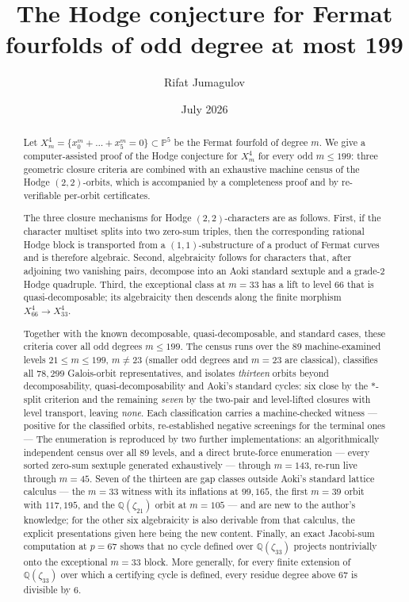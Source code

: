 \documentclass[11pt]{amsart}
\title[Hodge classes on odd-degree Fermat fourfolds]{The Hodge conjecture for Fermat fourfolds
of odd degree at most 199}
\author{Rifat Jumagulov}
\date{July 2026}
\theoremstyle{remark}
\newcommand{\Q}{\mathbb{Q}}
\newcommand{\PP}{\mathbb{P}}
\newcommand{\zt}{\zeta}
\begin{document}
\raggedbottom\vfuzz=3pt
\begin{abstract}
Let $X^4_m=\{x_0^m+\dots+x_5^m=0\}\subset\PP^5$ be the Fermat fourfold of degree $m$. We give a
computer-assisted proof of the Hodge conjecture for $X^4_m$ for every odd $m\le199$: three
geometric closure criteria are combined with an exhaustive machine census of the Hodge
$(2,2)$-orbits, which is accompanied by a completeness proof and by re-verifiable per-orbit
certificates.

The three closure mechanisms for Hodge $(2,2)$-characters are as follows. First, if the
character multiset splits into two zero-sum triples, then the corresponding rational Hodge
block is transported from a $(1,1)$-substructure of a product of Fermat curves and is therefore
algebraic. Second, algebraicity follows for characters that, after adjoining two vanishing
pairs, decompose into an Aoki standard sextuple and a grade-$2$ Hodge quadruple. Third, the
exceptional class at $m=33$ has a lift to level $66$ that is quasi-decomposable; its
algebraicity then descends along the finite morphism $X^4_{66}\to X^4_{33}$.

Together with the known decomposable, quasi-decomposable, and standard cases, these criteria
cover all odd degrees $m\le199$. The census runs over the $89$ machine-examined levels
$21\le m\le199$, $m\neq23$ (smaller odd degrees and $m=23$ are classical), classifies all
$78{,}299$ Galois-orbit representatives, and isolates \emph{thirteen} orbits beyond
decomposability, quasi-decomposability and Aoki's standard cycles: six close by the $*$-split
criterion and the remaining \emph{seven} by the two-pair and level-lifted closures with level
transport, leaving \emph{none}. Each
classification carries a machine-checked witness --- positive for the classified orbits,
re-established negative screenings for the terminal ones --- The enumeration is reproduced by two further
implementations: an algorithmically independent census over all $89$ levels, and a direct
brute-force enumeration --- every sorted zero-sum sextuple generated exhaustively --- through
$m=143$, re-run live through $m=45$. Seven of the thirteen are gap
classes outside Aoki's standard lattice calculus --- the $m=33$ witness with its inflations at
$99,165$, the first $m=39$ orbit with $117,195$, and the $\Q(\zt_{21})$ orbit at $m=105$ ---
and are new to the author's knowledge; for the other six algebraicity is also derivable from
that calculus, the explicit presentations given here being the new content.
Finally, an exact Jacobi-sum computation at $p=67$ shows that no cycle defined over
$\Q(\zt_{33})$ projects nontrivially onto the exceptional $m=33$ block. More generally, for every finite
extension of $\Q(\zt_{33})$ over which a certifying cycle is defined, every residue degree
above $67$ is divisible by $6$.
\end{abstract}
\maketitle
\end{document}
